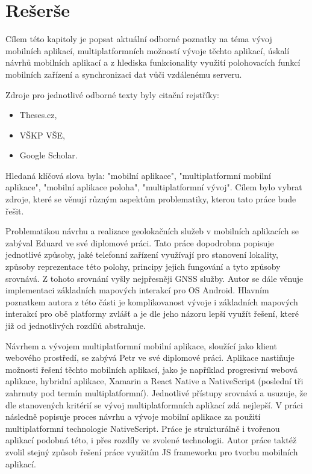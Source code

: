\chapter{Rešerše}

Cílem této kapitoly je popsat aktuální odborné poznatky na téma vývoj mobilních aplikací, multiplatformních možností vývoje těchto aplikací, úskalí návrhů mobilních aplikací a z hlediska funkcionality využití polohovacích funkcí mobilních zařízení a synchronizaci dat vůči vzdálenému serveru.

Zdroje pro jednotlivé odborné texty byly citační rejstříky:

\begin{itemize}
	\item Theses.cz,
	\item VŠKP VŠE,
	\item Google Scholar.
\end{itemize}

Hledaná klíčová slova byla: "mobilní aplikace", "multiplatformní mobilní aplikace", "mobilní aplikace poloha", "multiplatformní vývoj". Cílem bylo vybrat zdroje, které se věnují různým aspektům problematiky, kterou tato práce bude řešit.

Problematikou návrhu a realizace geolokačních služeb v mobilních aplikacích se zabýval Eduard  \textcite{Bakes2018thesis} ve své diplomové práci. Tato práce dopodrobna popisuje jednotlivé způsoby, jaké telefonní zařízení využívají pro stanovení lokality, způsoby reprezentace této polohy, principy jejich fungování a tyto způsoby srovnává. Z tohoto srovnání vyšly nejpřesněji GNSS služby. Autor se dále věnuje implementaci základních mapových interakcí pro OS Android. Hlavním poznatkem autora z této části je komplikovanost vývoje i základních mapových interakcí pro obě platformy zvlášť a je dle jeho názoru lepší využít řešení, které již od jednotlivých rozdílů abstrahuje.


Návrhem a vývojem multiplatformní mobilní aplikace, sloužící jako klient webového prostředí, se zabývá Petr \textcite{Domkar2018} ve své diplomové práci. Aplikace nastiňuje možnosti řešení těchto mobilních aplikací, jako je například progresivní webová aplikace, hybridní aplikace, Xamarin a React Native a NativeScript (poslední tři zahrnuty pod termín multiplatformní). Jednotlivé přístupy srovnává a usuzuje, že dle stanovených kritérií se vývoj multiplatformních aplikací zdá nejlepší. V práci následně popisuje proces návrhu a vývoje mobilní aplikace za použití multiplatformní technologie NativeScript. Práce je strukturálně i tvořenou aplikací podobná této, i přes rozdíly ve zvolené technologii. Autor práce taktéž zvolil stejný způsob řešení práce využitím JS frameworku pro tvorbu mobilních aplikací.

